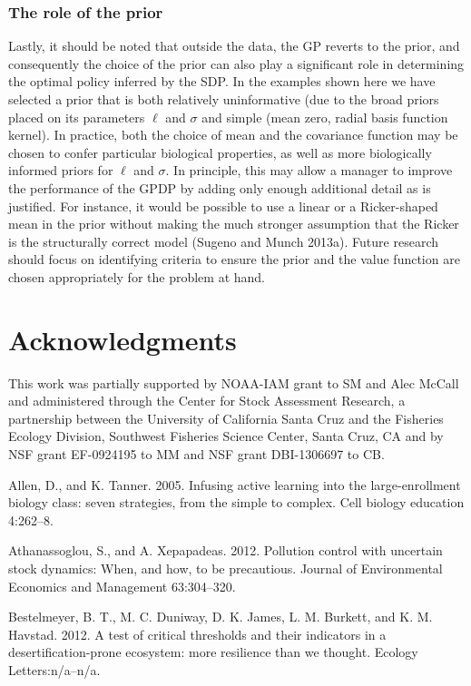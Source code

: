 \documentclass[author-year, 12pt,review]{components/elsarticle} %
\begin{document}
\subsubsection{The role of the prior}\label{the-role-of-the-prior}

Lastly, it should be noted that outside the data, the GP reverts to the
prior, and consequently the choice of the prior can also play a
significant role in determining the optimal policy inferred by the SDP.
In the examples shown here we have selected a prior that is both
relatively uninformative (due to the broad priors placed on its
parameters $\ell$ and $\sigma$ and simple (mean zero, radial basis
function kernel). In practice, both the choice of mean and the
covariance function may be chosen to confer particular biological
properties, as well as more biologically informed priors for $\ell$ and
$\sigma$. In principle, this may allow a manager to improve the
performance of the GPDP by adding only enough additional detail as is
justified. For instance, it would be possible to use a linear or a
Ricker-shaped mean in the prior without making the much stronger
assumption that the Ricker is the structurally correct model (Sugeno and
Munch 2013a). Future research should focus on identifying criteria to
ensure the prior and the value function are chosen appropriately for the
problem at hand.

\section{Acknowledgments}\label{acknowledgments}

This work was partially supported by NOAA-IAM grant to SM and Alec
McCall and administered through the Center for Stock Assessment
Research, a partnership between the University of California Santa Cruz
and the Fisheries Ecology Division, Southwest Fisheries Science Center,
Santa Cruz, CA and by NSF grant EF-0924195 to MM and NSF grant
DBI-1306697 to CB.

Allen, D., and K. Tanner. 2005. Infusing active learning into the
large-enrollment biology class: seven strategies, from the simple to
complex. Cell biology education 4:262--8.

Athanassoglou, S., and A. Xepapadeas. 2012. Pollution control with
uncertain stock dynamics: When, and how, to be precautious. Journal of
Environmental Economics and Management 63:304--320.

Bestelmeyer, B. T., M. C. Duniway, D. K. James, L. M. Burkett, and K. M.
Havstad. 2012. A test of critical thresholds and their indicators in a
desertification-prone ecosystem: more resilience than we thought.
Ecology Letters:n/a--n/a.
\end{document}
